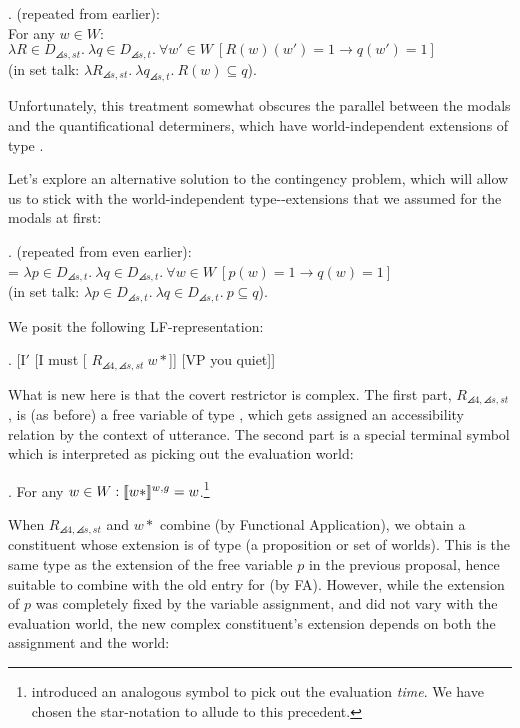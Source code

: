 \ex. (repeated from earlier):\\
For any $w \in W$: \\
$\lambda R\in D_{\angles{s,st}}.\ \lambda q\in D_{\angles{s,t}}.\ \forall w'\in W\ [R(w)(w') =1 \rightarrow q(w')=1]$\\
\null\hfill(in set talk: $\lambda R_{\angles{s,st}}.\ \lambda q_{\angles{s,t}}.\ R(w)\ensuremath{\subseteq}q$).

Unfortunately, this treatment somewhat obscures the parallel between
the modals and the quantificational determiners, which have
world-independent extensions of type .

Let's explore an alternative solution to the contingency problem,
which will allow us to stick with the world-independent
type--extensions that we assumed for the
modals at first:

\ex. (repeated from even earlier): \\
 = $\lambda p\in D_{\angles{s,t}}.\ \lambda q\in D_{\angles{s,t}}.\ \forall w\in W\ [p(w)=1 \rightarrow q(w)=1]$\\
\null\hfill(in set talk: $\lambda p \in D_{\angles{s,t}}.\ \lambda q \in D_{\angles{s,t}}.\ p \ensuremath{\subseteq} q$).

We posit the following LF-representation:

\exi. \label{brandlf} [I$'$ [I must [ $R_{\angles{4,\angles{s,st}}}\ w*$]] [VP you quiet]]

What is new here is that the covert restrictor is complex. The first
part, $R_{\angles{4,\angles{s,st}}}$, is (as before) a free variable
of type , which gets assigned an accessibility relation
by the context of utterance. %
%
The second part is a special terminal symbol which is interpreted as
picking out the evaluation world:

\ex. For any $w\in W: \llbracket w* \rrbracket^{w,g} = w$.\footnote{\citet{dowty:1982:time-adverbs} introduced an analogous symbol to pick out the evaluation \emph{time}. We have chosen the star-notation to allude to this precedent.}

When $R_{\angles{4,\angles{s,st}}}$ and $w*$ combine (by
Functional Application), we obtain a constituent whose extension is of
type  (a proposition or set of worlds). This is the same
type as the extension of the free variable $p$ in the previous
proposal, hence suitable to combine with the old entry for
 (by FA). However, while the extension of $p$ was
completely fixed by the variable assignment, and did not vary with the
evaluation world, the new complex constituent's extension depends on
both the assignment and the world:

